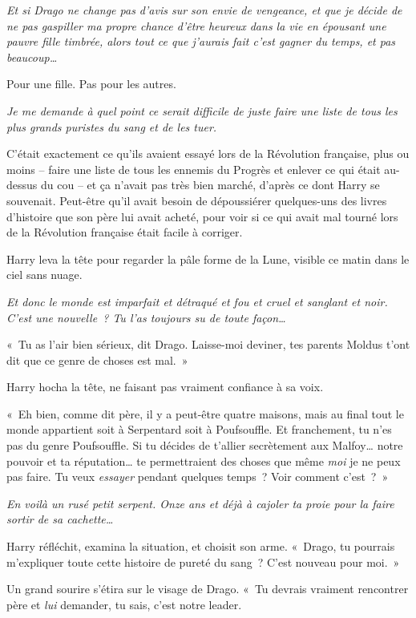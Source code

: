 \emph{Et si Drago ne change pas d'avis sur son envie de vengeance, et que je décide de ne pas gaspiller ma propre chance d'être heureux dans la vie en épousant une pauvre fille timbrée, alors tout ce que j'aurais fait c'est gagner du temps, et pas beaucoup…}

Pour une fille. Pas pour les autres.

\emph{Je me demande à quel point ce serait difficile de juste faire une liste de tous les plus grands puristes du sang et de les tuer.}

C'était exactement ce qu'ils avaient essayé lors de la Révolution française, plus ou moins -- faire une liste de tous les ennemis du Progrès et enlever ce qui était au-dessus du cou -- et ça n'avait pas très bien marché, d'après ce dont Harry se souvenait.
Peut-être qu'il avait besoin de dépoussiérer quelques-uns des livres d'histoire que son père lui avait acheté, pour voir si ce qui avait mal tourné lors de la Révolution française était facile à corriger.

Harry leva la tête pour regarder la pâle forme de la Lune, visible ce matin dans le ciel sans nuage.

\emph{Et donc le monde est imparfait et détraqué et fou et cruel et sanglant et noir. C'est une nouvelle~? Tu l'as toujours su de toute façon…}

«~Tu as l'air bien sérieux, dit Drago. Laisse-moi deviner, tes parents Moldus t'ont dit que ce genre de choses est mal.~»

Harry hocha la tête, ne faisant pas vraiment confiance à sa voix.

«~Eh bien, comme dit père, il y a peut-être quatre maisons, mais au final tout le monde appartient soit à Serpentard soit à Poufsouffle.
Et franchement, tu n'es pas du genre Poufsouffle.
Si tu décides de t'allier secrètement aux Malfoy… notre pouvoir et ta réputation… te permettraient des choses que même \emph{moi} je ne peux pas faire.
Tu veux \emph{essayer} pendant quelques temps~? Voir comment c'est~?~»

\emph{En voilà un rusé petit serpent. Onze ans et déjà à cajoler ta proie pour la faire sortir de sa cachette…}

Harry réfléchit, examina la situation, et choisit son arme.
«~Drago, tu pourrais m'expliquer toute cette histoire de pureté du sang~? C'est nouveau pour moi.~»

Un grand sourire s'étira sur le visage de Drago.  «~Tu devrais vraiment rencontrer père et \emph{lui} demander, tu sais, c'est notre leader.

